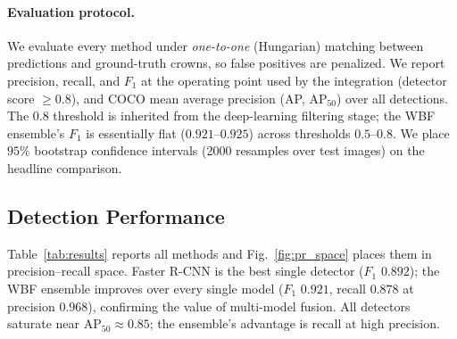 \documentclass{article}
\begin{document}
\paragraph{Evaluation protocol.} We evaluate every method under \emph{one-to-one} (Hungarian) matching between predictions and ground-truth crowns, so false positives are penalized. We report precision, recall, and $F_1$ at the operating point used by the integration (detector score $\geq 0.8$), and COCO mean average precision (AP, AP$_{50}$) over all detections. The $0.8$ threshold is inherited from the deep-learning filtering stage; the WBF ensemble's $F_1$ is essentially flat ($0.921$--$0.925$) across thresholds $0.5$--$0.8$. We place $95\%$ bootstrap confidence intervals (2000 resamples over test images) on the headline comparison.

\subsection{Detection Performance}

Table~\ref{tab:results} reports all methods and Fig.~\ref{fig:pr_space} places them in precision--recall space. Faster R-CNN is the best single detector ($F_1$ $0.892$); the WBF ensemble improves over every single model ($F_1$ $0.921$, recall $0.878$ at precision $0.968$), confirming the value of multi-model fusion. All detectors saturate near AP$_{50}\approx 0.85$; the ensemble's advantage is recall at high precision.
\end{document}
